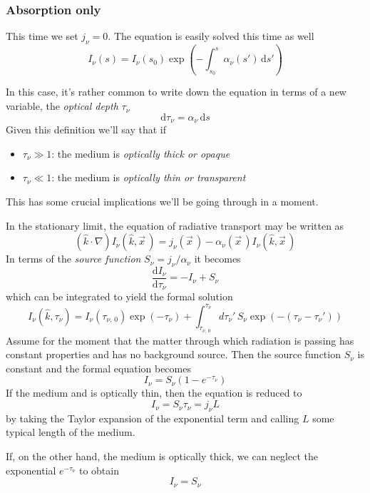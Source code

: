 \subsubsection*{Absorption only}
This time we set $j_{\nu} = 0$. The equation is easily solved this time as well 
\begin{equation*}
	I_{\nu}(s) = I_{\nu}(s_{0})\exp\left(-\int_{s_{0}}^{s} \alpha_{\nu}(s')\,\text{d}s'\right)
\end{equation*}
\par In this case, it's rather common to write down the equation in terms of a new variable, the \emph{optical depth} $\tau_{\nu}$
\begin{equation}
	\text{d}\tau_{\nu} = \alpha_{\nu}\,\text{d}s
	\label{eq:optical_depth}
\end{equation}
Given this definition we'll say that if
\begin{itemize}
	\item $\tau_{\nu} \gg 1$: the medium is \emph{optically thick or opaque}
	\item $\tau_{\nu} \ll 1$: the medium is \emph{optically thin or transparent}
\end{itemize}
This has some crucial implications we'll be going through in a moment.
\par In the stationary limit, the equation of radiative transport may be written as 
\begin{equation*}
	(\hat{k}\cdot \nabla)I_{\nu}(\hat{k}, \vec{x}\,) = j_{\nu}(\vec{x}\,)-\alpha_{\nu}(\vec{x}\,)I_{\nu}(\hat{k}, \vec{x}\,)
\end{equation*}
In terms of the \emph{source function} $S_{\nu} = j_{\nu}/\alpha_{\nu}$ it becomes
\begin{equation}
	\frac{\text{d}I_{\nu}}{\text{d}\tau_{\nu}} = -I_{\nu}+S_{\nu}
\end{equation}
which can be integrated to yield the formal solution
\begin{equation*}
	I_{\nu}(\hat{k}, \tau_{\nu}) = I_{\nu}(\tau_{\nu,\,0})\exp(-\tau_{\nu})+\int_{\tau_{\nu,\,0}}^{\tau_{\nu}} d\tau_{\nu}'\,S_{\nu}\exp(-(\tau_{\nu}-\tau_{\nu}'))
\end{equation*}
Assume for the moment that the matter through which radiation is passing has constant properties and has no background source. Then the source function $S_{\nu}$ is constant and the formal equation becomes
\begin{equation*}
	I_{\nu} = S_{\nu}(1-e^{-\tau_{\nu}})
\end{equation*}
If the medium  and is optically thin, then the equation is reduced to 
\begin{equation}
	I_{\nu} = S_{\nu}\tau_{\nu} = j_{\nu}L
\end{equation}
by taking the Taylor expansion of the exponential term and calling $L$ some typical length of the medium.
\par If, on the other hand, the medium is optically thick, we can neglect the exponential $e^{-\tau_{\nu}}$ to obtain
\begin{equation}
	I_{\nu} = S_{\nu}
	\label{k1}
\end{equation}
